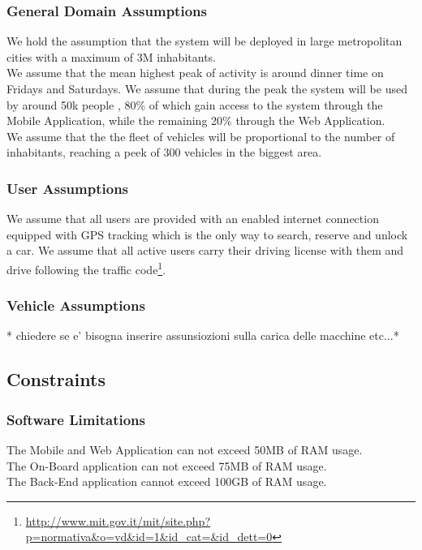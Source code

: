 \documentclass[12pt]{article}
\begin{document}
		\subsubsection{General Domain Assumptions}
			We hold the assumption that the system will be deployed in large metropolitan cities with a maximum of 3M inhabitants.\\
			We assume that the mean highest peak of activity is around dinner time on Fridays and Saturdays. We assume that during the peak the system will be used by around 50k people , 80\% of which gain access to the system through the Mobile Application, while the remaining 20\% through the Web Application.\\
			We assume that the the fleet of vehicles will be proportional to the number of inhabitants, reaching a peek of 300 vehicles in the biggest area.\\
		\subsubsection{User Assumptions}
		We assume that all users are provided with an enabled internet connection equipped with GPS tracking which is the only way to search, reserve and unlock a car.
		We assume that all active users carry their driving license with them and drive following the traffic code\footnote{\url {http://www.mit.gov.it/mit/site.php?p=normativa&o=vd&id=1&id_cat=&id_dett=0}}.
		\subsubsection{Vehicle Assumptions}
		* chiedere se e' bisogna inserire assunsiozioni sulla carica delle macchine etc...*		
			
	\subsection{Constraints}
	
	\subsubsection{Software Limitations}
	The Mobile and Web Application can not exceed 50MB of RAM usage.\\
	The On-Board application can not exceed 75MB of RAM usage.\\
	The Back-End application cannot exceed 100GB of RAM usage.
	\newpage
\end{document}
